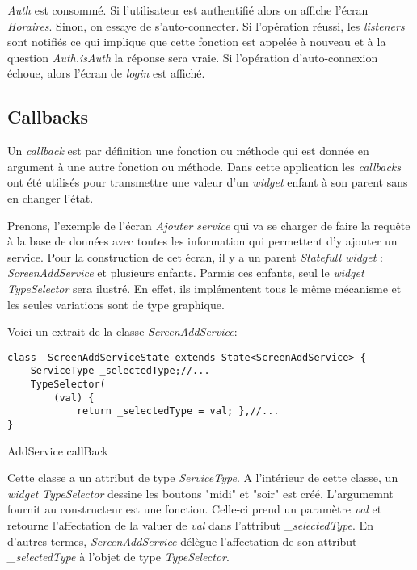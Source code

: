 \textit{Auth} est consommé. Si l'utilisateur est authentifié alors on affiche l'écran \textit{Horaires}. Sinon, on essaye de s'auto-connecter. Si l'opération réussi, les \textit{listeners} sont notifiés ce qui implique que cette fonction est appelée à nouveau et à la question \textit{Auth.isAuth} la réponse sera vraie. Si l'opération d'auto-connexion échoue, alors l'écran de \textit{login} est affiché.

\subsection*{Callbacks}
Un \textit{callback} est par définition une fonction ou méthode qui est donnée en argument à une autre fonction ou méthode. 
Dans cette application les \textit{callbacks} ont été utilisés pour transmettre une valeur d'un \textit{widget} enfant à son parent sans en changer l'état. 

Prenons, l'exemple de l'écran \textit{Ajouter service} qui va se charger de faire la requête à la base de données avec toutes les information qui permettent d'y ajouter un service. Pour la construction de cet écran, il y a un parent \textit{Statefull widget} : \textit{ScreenAddService} et plusieurs enfants. Parmis ces enfants, seul le \textit{widget} \textit{TypeSelector} sera ilustré. En effet, ils implémentent tous le même mécanisme et les seules variations sont de type graphique.

Voici un extrait de la classe \textit{ScreenAddService}:
\begin{listing}[!h]
\begin{verbatim}
class _ScreenAddServiceState extends State<ScreenAddService> {
    ServiceType _selectedType;//...
    TypeSelector(
        (val) {
            return _selectedType = val; },//...
}
\end{verbatim}
\caption{AddService callBack}
\label{code:addServiceCallback}
\end{listing}

Cette classe a un attribut de type \textit{ServiceType}. A l'intérieur de cette classe, un \textit{widget} \textit{TypeSelector} dessine les boutons "midi" et "soir" est créé. L'argumemnt fournit au constructeur est une fonction. Celle-ci prend un paramètre \textit{val} et retourne l'affectation de la valuer de \textit{val} dans l'attribut \textit{\_selectedType}. En d'autres termes, \textit{ScreenAddService} délègue l'affectation de son attribut \textit{\_selectedType} à l'objet de type \textit{TypeSelector}. 

